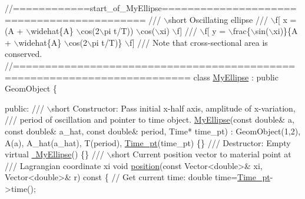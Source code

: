  
\begin{DoxyCodeInclude}
\textcolor{comment}{//============start\_of\_MyEllipse===========================================}
\textcolor{comment}{/// \(\backslash\)short Oscillating ellipse}
\textcolor{comment}{}\textcolor{comment}{/// \(\backslash\)f[ x = (A + \(\backslash\)widehat\{A\} \(\backslash\)cos(2\(\backslash\)pi t/T)) \(\backslash\)cos(\(\backslash\)xi)  \(\backslash\)f]}
\textcolor{comment}{}\textcolor{comment}{/// \(\backslash\)f[ y = \(\backslash\)frac\{\(\backslash\)sin(\(\backslash\)xi)\}\{A + \(\backslash\)widehat\{A\} \(\backslash\)cos(2\(\backslash\)pi t/T)\}   \(\backslash\)f]}
\textcolor{comment}{}\textcolor{comment}{/// Note that cross-sectional area is conserved.}
\textcolor{comment}{}\textcolor{comment}{//=========================================================================}
\textcolor{keyword}{class }\hyperlink{classMyEllipse}{MyEllipse} : \textcolor{keyword}{public} GeomObject
\{

\textcolor{keyword}{public}:
\textcolor{comment}{}
\textcolor{comment}{ /// \(\backslash\)short Constructor:  Pass initial x-half axis, amplitude of x-variation, }
\textcolor{comment}{ /// period of oscillation and pointer to time object.}
\textcolor{comment}{} \hyperlink{classMyEllipse_a6d780f1f450d99e175842e88a3079069}{MyEllipse}(\textcolor{keyword}{const} \textcolor{keywordtype}{double}& a, \textcolor{keyword}{const} \textcolor{keywordtype}{double}& a\_hat,
           \textcolor{keyword}{const} \textcolor{keywordtype}{double}& period, Time* time\_pt) : 
  GeomObject(1,2), A(a), A\_hat(a\_hat), T(period), \hyperlink{classMyEllipse_abc1c4c863a599ce87bdff1abb9971953}{Time\_pt}(time\_pt) \{\}
\textcolor{comment}{}
\textcolor{comment}{ /// Destructor: Empty}
\textcolor{comment}{} \textcolor{keyword}{virtual} \hyperlink{classMyEllipse_ac2f2d3fb269c57fb26b4db6d9a0c7c05}{~MyEllipse}() \{\}
\textcolor{comment}{}
\textcolor{comment}{ /// \(\backslash\)short Current position vector to material point at }
\textcolor{comment}{ /// Lagrangian coordinate xi }
\textcolor{comment}{} \textcolor{keywordtype}{void} \hyperlink{classMyEllipse_a7b139a2f4564005773c83325f2414e3e}{position}(\textcolor{keyword}{const} Vector<double>& xi, Vector<double>& r)\textcolor{keyword}{ const}
\textcolor{keyword}{  }\{
   \textcolor{comment}{// Get current time:}
   \textcolor{keywordtype}{double} time=\hyperlink{classMyEllipse_abc1c4c863a599ce87bdff1abb9971953}{Time\_pt}->time();


\end{DoxyCodeInclude}
